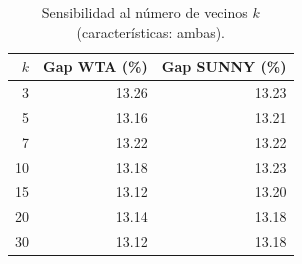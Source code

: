 \begin{table}[H]
  \centering
  \small
  \singlespacing
  \caption{Sensibilidad al número de vecinos $k$ (características: ambas).}
  \label{tab:sensibilidad_k}
  \begin{tabular}{rrr}
    \toprule
    $k$ & Gap WTA (\%) & Gap SUNNY (\%) \\
    \midrule
    3 & 13.26 & 13.23 \\
    5 & 13.16 & 13.21 \\
    7 & 13.22 & 13.22 \\
    10 & 13.18 & 13.23 \\
    15 & 13.12 & 13.20 \\
    20 & 13.14 & 13.18 \\
    30 & 13.12 & 13.18 \\
    \bottomrule
  \end{tabular}
\end{table}
